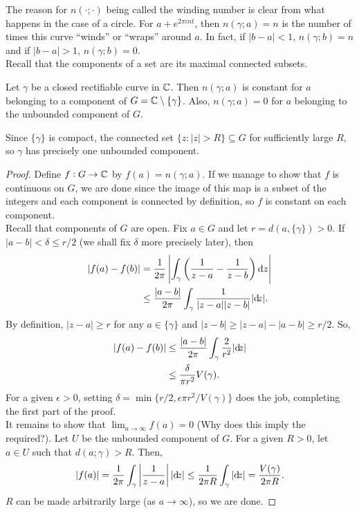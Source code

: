 	The reason for $n(\cdot;\cdot)$ being called the winding number is clear from what happens in the case of a circle. For $a + e^{2\pi\iota n t}$, then $n(\gamma;a) = n$ is the number of times this curve ``winds'' or ``wraps'' around $a$. In fact, if $|b-a| < 1$, $n(\gamma;b) = n$ and if $|b-a| > 1$, $n(\gamma;b) = 0$.\\

	Recall that the components of a set are its maximal connected subsets.

	\begin{ftheo}
		Let $\gamma$ be a closed rectifiable curve in $\mathbb{C}$. Then $n(\gamma;a)$ is constant for $a$ belonging to a component of $G = \mathbb{C} \setminus \{\gamma\}$. Also, $n(\gamma;a) = 0$ for $a$ belonging to the unbounded component of $G$.
	\end{ftheo}
	\begin{remark}
		Since $\{\gamma\}$ is compact, the connected set $\{ z : |z| > R \} \subseteq G$ for sufficiently large $R$, so $\gamma$ has precisely one unbounded component.
	\end{remark}
	\begin{proof}
		Define $f : G \to \mathbb{C}$ by $f(a) = n(\gamma;a)$.
		If we manage to show that $f$ is continuous on $G$, we are done since the image of this map is a subset of the integers and each component is connected by definition, so $f$ is constant on each component.\\
		Recall that components of $G$ are open. Fix $a \in G$ and let $r = d(a , \{\gamma\}) > 0$. If $|a-b| < \delta \le r/2$ (we shall fix $\delta$ more precisely later), then
		\begin{align*}
			|f(a) - f(b)| &= \frac{1}{2\pi} \left| \int_\gamma \left( \frac{1}{z-a} - \frac{1}{z-b} \right) \dif z \right| \\
				&\le \frac{|a-b|}{2\pi} \int_\gamma \frac{1}{|z-a||z-b|} |{\dif} {z}|.
		\end{align*}
		By definition, $|z-a| \ge r$ for any $a \in \{\gamma\}$ and $|z-b| \ge |z-a| - |a-b| \ge r/2$. So,
		\begin{align*}
			|f(a) - f(b)| &\le \frac{|a-b|}{2\pi} \int_\gamma \frac{2}{r^2} |{\dif} {z}| \\
				&\le \frac{\delta}{\pi r^2} V(\gamma).
		\end{align*}
		For a given $\epsilon > 0$, setting $\delta = \min\{r/2, \epsilon\pi r^2 / V(\gamma)\}$ does the job, completing the first part of the proof.\\

		It remains to show that $\lim_{a\to\infty}f(a) = 0$ (Why does this imply the required?). Let $U$ be the unbounded component of $G$. For a given $R > 0$, let $a \in U$ such that $d(a;\gamma) > R$. Then,
		\[ |f(a)| = \frac{1}{2\pi} \int_\gamma \left|\frac{1}{z-a}\right| |{\dif} {z}| \le \frac{1}{2\pi R} \int_\gamma |{\dif} {z}| = \frac{V(\gamma)}{2\pi R}. \]
		$R$ can be made arbitrarily large (as $a\to\infty$), so we are done.
	\end{proof}

